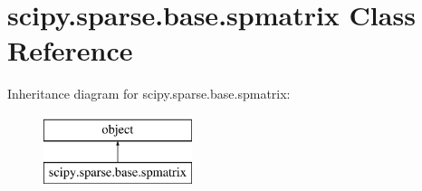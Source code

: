 \hypertarget{classscipy_1_1sparse_1_1base_1_1spmatrix}{}\section{scipy.\+sparse.\+base.\+spmatrix Class Reference}
\label{classscipy_1_1sparse_1_1base_1_1spmatrix}
Inheritance diagram for scipy.\+sparse.\+base.\+spmatrix\+:\begin{figure}[H]
\begin{center}
\leavevmode
\includegraphics[height=2.000000cm]{classscipy_1_1sparse_1_1base_1_1spmatrix}
\end{center}
\end{figure}
